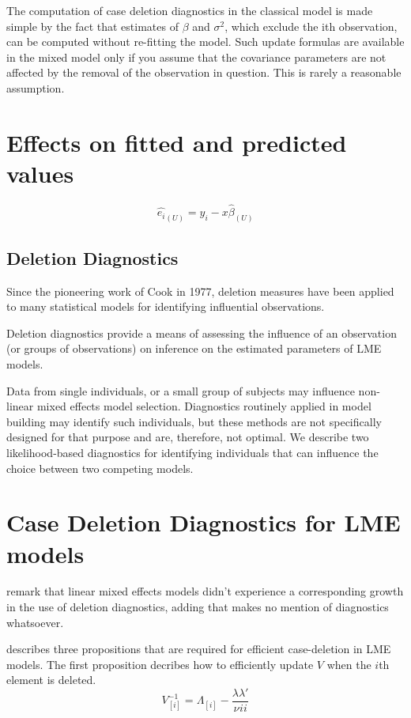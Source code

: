 \documentclass[MAIN.tex]{subfiles}
\begin{document}
The computation of case deletion diagnostics in the classical model is made simple by the fact that estimates of $\beta$ and $\sigma^2$, which exclude the ith observation, can be computed without re-fitting the model. Such update formulas are available in the mixed model only if you assume that the covariance parameters are not affected by the removal of the observation in question. This is rarely a reasonable assumption.

\section{Effects on fitted and predicted values}
\begin{equation}
\hat{e_{i}}_{(U)} = y_{i} - x\hat{\beta}_{(U)}
\end{equation}

\subsection{Deletion Diagnostics}

Since the pioneering work of Cook in 1977, deletion measures have been applied to many statistical models for identifying influential observations.

Deletion diagnostics provide a means of assessing the influence of an observation (or groups of observations) on inference on the estimated parameters of LME models.

Data from single individuals, or a small group of subjects may influence non-linear mixed effects model selection. Diagnostics routinely applied in model building may identify such individuals, but these methods are not specifically designed for that purpose and are, therefore, not optimal. We describe two likelihood-based diagnostics for identifying individuals that can influence the choice between two competing models.

	\section{Case Deletion Diagnostics for LME models}
	
	\citet{HaslettDillane} remark that linear mixed effects models
	didn't experience a corresponding growth in the use of deletion
	diagnostics, adding that \citet{McCullSearle} makes no mention of
	diagnostics whatsoever.
	
	\citet{Christensen} describes three propositions that are required
	for efficient case-deletion in LME models. The first proposition
	decribes how to efficiently update $V$ when the $i$th element is
	deleted.
	\begin{equation}
	V_{[i]}^{-1} = \Lambda_{[i]} - \frac{\lambda
		\lambda\prime}{\nu^{}ii}
	\end{equation}
	
\end{document}
